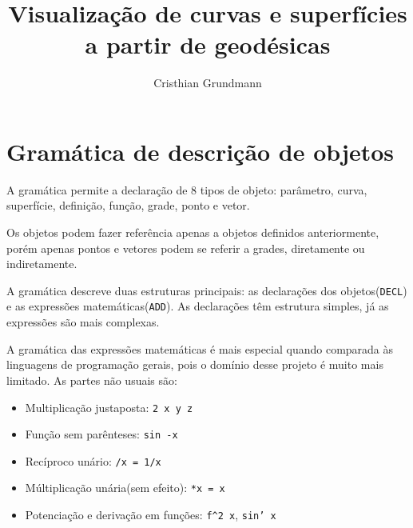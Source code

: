 \documentclass[10pt,a4paper,final]{article}
\author{Cristhian Grundmann}
\title{Visualização de curvas e superfícies a partir de geodésicas}
\begin{document}
\maketitle



\section{Gramática de descrição de objetos}
A gramática permite a declaração de 8 tipos de objeto: parâmetro, curva, superfície, definição, função, grade, ponto e vetor.

Os objetos podem fazer referência apenas a objetos definidos anteriormente, porém apenas pontos e vetores podem se referir a grades, diretamente ou indiretamente.

A gramática descreve duas estruturas principais: as declarações dos objetos(\texttt{DECL}) e as expressões matemáticas(\texttt{ADD}). As declarações têm estrutura simples, já as expressões são mais complexas.

A gramática das expressões matemáticas é mais especial quando comparada às linguagens de programação gerais, pois o domínio desse projeto é muito mais limitado. As partes não usuais são:

\begin{itemize}
\item Multiplicação justaposta: \texttt{2 x y z}
\item Função sem parênteses: \texttt{sin -x}
\item Recíproco unário: \texttt{/x = 1/x}
\item Múltiplicação unária(sem efeito): \texttt{*x = x}
\item Potenciação e derivação em funções: \texttt{f\textasciicircum 2 x}, \texttt{sin' x}
\end{itemize}


\begin{tcolorbox}
\begin{small}

\end{small}
\end{tcolorbox}
\end{document}
